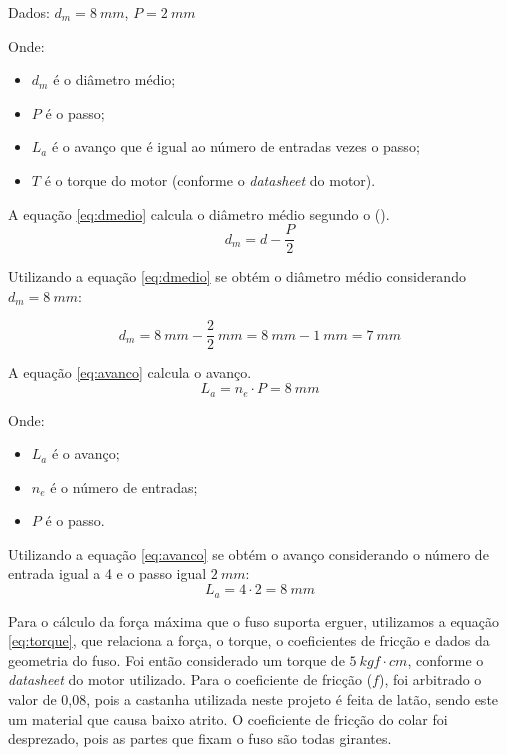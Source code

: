Dados:
$d_{m} = 8~mm$, $P = 2~mm$

Onde:
\begin{itemize}
    \item $d_{m}$ é o diâmetro médio;
    \item $P$ é o passo;
    \item $L_{a}$ é o avanço que é igual ao número de entradas vezes o passo;
    \item $T$ é o torque do motor (conforme o \textit{datasheet} do motor).
\end{itemize}

A equação \ref{eq:dmedio} calcula o diâmetro médio segundo o \citeauthor{budynas2016elementos} (\citeyear{budynas2016elementos}).
\begin{equation}\label{eq:dmedio}
    d_{m} = d - \frac{P}{2}
\end{equation}

Utilizando a equação \ref{eq:dmedio} se obtém o diâmetro médio considerando $d_{m} = 8~mm$:

$$d_{m} = 8~mm - \frac{2}{2}~mm = 8~mm - 1~mm = 7~mm$$

A equação \ref{eq:avanco} calcula o avanço.
\begin{equation}\label{eq:avanco}
    L_{a} = n_{e} \cdot P = 8~mm
\end{equation}

Onde:
\begin{itemize}
    \item $L_{a}$ é o avanço;
    \item $n_{e}$ é o número de entradas;
    \item $P$ é o passo.
\end{itemize}

Utilizando a equação \ref{eq:avanco} se obtém o avanço considerando o número de entrada igual a 4 e o passo igual $2~mm$:
$$L_{a} = 4 \cdot 2 = 8~mm$$ 

Para o cálculo da força máxima que o fuso suporta erguer, utilizamos a equação \ref{eq:torque}, que relaciona a força, 
o torque, o coeficientes de fricção e dados da geometria do fuso. Foi então considerado um torque 
de $5~kgf \cdot cm$, conforme o \textit{datasheet} do motor utilizado. Para o coeficiente de fricção ($f$), 
foi arbitrado o valor de 0,08, pois a castanha utilizada neste projeto é feita de latão, 
sendo este um material que causa baixo atrito. O coeficiente de fricção do colar foi desprezado, 
pois as partes que fixam o fuso são todas girantes.

